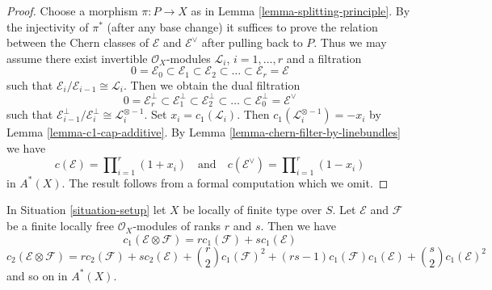 \begin{proof}
Choose a morphism $\pi : P \to X$ as in
Lemma \ref{lemma-splitting-principle}.
By the injectivity of $\pi^*$ (after any base change)
it suffices to prove the relation between
the Chern classes of $\mathcal{E}$ and $\mathcal{E}^\vee$
after pulling back to $P$. Thus we may assume there
exist invertible $\mathcal{O}_X$-modules
${\mathcal L}_i$, $i = 1, \ldots, r$
and a filtration
$$
0 = \mathcal{E}_0 \subset \mathcal{E}_1 \subset \mathcal{E}_2
\subset \ldots \subset \mathcal{E}_r = \mathcal{E}
$$
such that $\mathcal{E}_i/\mathcal{E}_{i - 1} \cong \mathcal{L}_i$.
Then we obtain the dual filtration
$$
0 = \mathcal{E}_r^\perp \subset \mathcal{E}_1^\perp \subset \mathcal{E}_2^\perp
\subset \ldots \subset \mathcal{E}_0^\perp = \mathcal{E}^\vee
$$
such that $\mathcal{E}_{i - 1}^\perp/\mathcal{E}_i^\perp \cong
\mathcal{L}_i^{\otimes -1}$.
Set $x_i = c_1(\mathcal{L}_i)$.
Then $c_1(\mathcal{L}_i^{\otimes -1}) = - x_i$
by Lemma \ref{lemma-c1-cap-additive}.
By Lemma \ref{lemma-chern-filter-by-linebundles}
we have
$$
c(\mathcal{E}) = \prod\nolimits_{i = 1}^r (1 + x_i)
\quad\text{and}\quad
c(\mathcal{E}^\vee) = \prod\nolimits_{i = 1}^r (1 - x_i)
$$
in $A^*(X)$. The result follows from a formal computation
which we omit.
\end{proof}

\begin{lemma}
\label{lemma-chern-classes-tensor-product}
In Situation \ref{situation-setup} let $X$ be locally of finite type over $S$.
Let $\mathcal{E}$ and $\mathcal{F}$ be a finite locally free
$\mathcal{O}_X$-modules of ranks $r$ and $s$. Then we have
$$
c_1(\mathcal{E} \otimes \mathcal{F})
=
r c_1(\mathcal{F}) + s c_1(\mathcal{E})
$$
$$
c_2(\mathcal{E} \otimes \mathcal{F})
=
r c_2(\mathcal{F}) + s c_2(\mathcal{E}) +
{r \choose 2} c_1(\mathcal{F})^2 +
(rs - 1) c_1(\mathcal{F})c_1(\mathcal{E}) +
{s \choose 2} c_1(\mathcal{E})^2
$$
and so on in $A^*(X)$.
\end{lemma}

